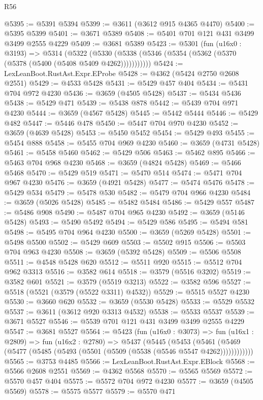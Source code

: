 \begin{lexlean}{R56}
\begin{coremodule}
@5395 := @5391 @5394
@5399 := @3611 (@3612 @915 @4365 @4470)
@5400 := @5395 @5399
@5401 := @3671 @5389
@5408 := @5401 @701 @121 @431 @3499 @3499 @2555 @4229
@5409 := @3681 @5389
@5423 := @5301
    (fun (u16x0 : @3193) =>
    @5314
      (@5322 (@5330 (@5338 (@5346 (@5354 (@5362 (@5370 (@5378 (@5400 (@5408 @5409 @4262)))))))))))
@5424 := LexLeanBoot.RustAst.Expr.EProbe
@5428 := @4362 (@5424 @2750 @2608 @2551)
@5429 := @4533 @5428
@5431 := @5429 @457 @404
@5434 := @5431 @704 @972 @4230
@5436 := @3659 (@4505 @5428)
@5437 := @5434 @5436
@5438 := @5429 @471
@5439 := @5438 @878
@5442 := @5439 @704 @971 @4230
@5444 := @3659 (@4567 @5428)
@5445 := @5442 @5444
@5446 := @5429 @482
@5447 := @5446 @478
@5450 := @5447 @704 @970 @4230
@5452 := @3659 (@4639 @5428)
@5453 := @5450 @5452
@5454 := @5429 @493
@5455 := @5454 @888
@5458 := @5455 @704 @969 @4230
@5460 := @3659 (@4731 @5428)
@5461 := @5458 @5460
@5462 := @5429 @506
@5463 := @5462 @895
@5466 := @5463 @704 @968 @4230
@5468 := @3659 (@4824 @5428)
@5469 := @5466 @5468
@5470 := @5429 @519
@5471 := @5470 @514
@5474 := @5471 @704 @967 @4230
@5476 := @3659 (@4921 @5428)
@5477 := @5474 @5476
@5478 := @5429 @534
@5479 := @5478 @530
@5482 := @5479 @704 @966 @4230
@5484 := @3659 (@5026 @5428)
@5485 := @5482 @5484
@5486 := @5429 @557
@5487 := @5486 @908
@5490 := @5487 @704 @965 @4230
@5492 := @3659 (@5146 @5428)
@5493 := @5490 @5492
@5494 := @5429 @586
@5495 := @5494 @581
@5498 := @5495 @704 @964 @4230
@5500 := @3659 (@5269 @5428)
@5501 := @5498 @5500
@5502 := @5429 @609
@5503 := @5502 @915
@5506 := @5503 @704 @963 @4230
@5508 := @3659 (@5392 @5428)
@5509 := @5506 @5508
@5511 := @4548 @5428 @620
@5512 := @5511 @920
@5515 := @5512 @704 @962 @3313
@5516 := @3582 @614
@5518 := @3579 (@5516 @3202)
@5519 := @3582 @601
@5521 := @3579 (@5519 @3213)
@5522 := @3582 @596
@5527 := @5518 (@5521 (@3579 (@5522 @3311) @4532))
@5529 := @5515 @5527 @4230
@5530 := @3660 @620
@5532 := @3659 (@5530 @5428)
@5533 := @5529 @5532
@5537 := @3611 (@3612 @920 @3313 @4532)
@5538 := @5533 @5537
@5539 := @3671 @5527
@5546 := @5539 @701 @121 @431 @3499 @3499 @2555 @4229
@5547 := @3681 @5527
@5564 := @5423
    (fun (u16x0 : @3073) =>
    fun (u16x1 : @2809) =>
    fun (u16x2 : @2780) =>
    @5437
      (@5445
        (@5453
          (@5461 (@5469 (@5477 (@5485 (@5493 (@5501 (@5509 (@5538 (@5546 @5547 @4262))))))))))))
@5565 := @3753 @4485
@5566 := LexLeanBoot.RustAst.Expr.EBlock
@5568 := @5566 @2608 @2551
@5569 := @4362 @5568
@5570 := @5565 @5569
@5572 := @5570 @457 @404
@5575 := @5572 @704 @972 @4230
@5577 := @3659 (@4505 @5569)
@5578 := @5575 @5577
@5579 := @5570 @471

\end{coremodule}
\end{lexlean}
